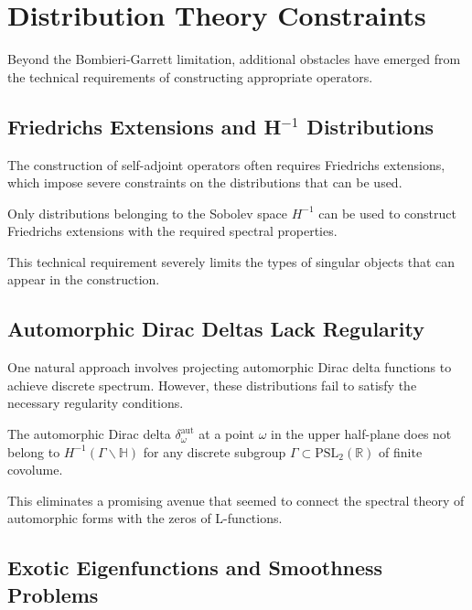 \section{Distribution Theory Constraints}
\label{sec:distribution_constraints}

Beyond the Bombieri-Garrett limitation, additional obstacles have emerged from the technical requirements of constructing appropriate operators.

\subsection{Friedrichs Extensions and H$^{-1}$ Distributions}

The construction of self-adjoint operators often requires Friedrichs extensions, which impose severe constraints on the distributions that can be used.

\begin{theorem}[H$^{-1}$ Requirement]
\label{thm:h_minus_one}
Only distributions belonging to the Sobolev space $H^{-1}$ can be used to construct Friedrichs extensions with the required spectral properties.
\end{theorem}

This technical requirement severely limits the types of singular objects that can appear in the construction.

\subsection{Automorphic Dirac Deltas Lack Regularity}

One natural approach involves projecting automorphic Dirac delta functions to achieve discrete spectrum. However, these distributions fail to satisfy the necessary regularity conditions.

\begin{proposition}
\label{prop:regularity_failure}
The automorphic Dirac delta $\delta_\omega^{\text{aut}}$ at a point $\omega$ in the upper half-plane does not belong to $H^{-1}(\Gamma \backslash \mathbb{H})$ for any discrete subgroup $\Gamma \subset \text{PSL}_2(\mathbb{R})$ of finite covolume.
\end{proposition}

This eliminates a promising avenue that seemed to connect the spectral theory of automorphic forms with the zeros of L-functions.

\subsection{Exotic Eigenfunctions and Smoothness Problems}

